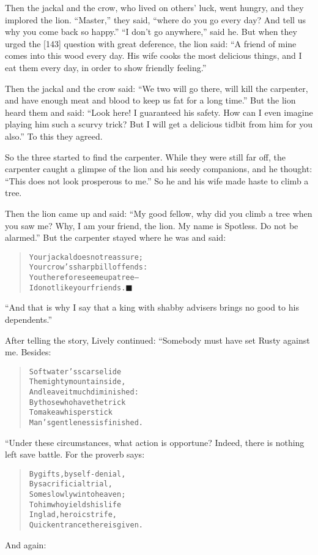 \documentclass[article, twoside, 14pt]{memoir}
\newcommand{\qed}{\hfill \ensuremath{\blacksquare}}
\renewenvironment{verbatim}{%
\begin{quote}%
\vskip -10pt%
\begin{alltt}\normalfont\large}{\end{alltt}%
\end{quote}%
\vskip -10pt
} %
\begin{document}
Then the jackal and the crow, who lived on others' luck, went
hungry, and they implored the lion. ``Master,'' they said,
``where do you go every day? And tell us why you come back so happy.''
``I don't go anywhere,'' said he. But when they urged the [143]
question with great deference, the lion said:
``A friend of mine comes into this wood every day. His wife cooks the most delicious things, and I eat them every day, in order to show friendly feeling.''

Then the jackal and the crow said:
``We two will go there, will kill the carpenter, and have enough meat and blood to keep us fat for a long time.''
But the lion heard them and said:
``Look here! I guaranteed his safety. How can I even imagine playing him such a scurvy trick? But I will get a delicious tidbit from him for you also.''
To this they agreed.

So the three started to find the carpenter. While they were still
far off, the carpenter caught a glimpse of the lion and his seedy
companions, and he thought:
``This does not look prosperous to me.'' So he and his wife made
haste to climb a tree.

Then the lion came up and said:
``My good fellow, why did you climb a tree when you saw me? Why, I am your friend, the lion. My name is Spotless. Do not be alarmed.''
But the carpenter stayed where he was and said:

\begin{verbatim}
Your jackal does not reassure;
    Your crow's sharp bill offends:
You therefore see me up a tree--
    I do not like your friends.\hyperref[s17]{\qed}
\end{verbatim}
``And that is why I say that a king with shabby advisers brings no good to his dependents.''

After telling the story, Lively continued: “Somebody must have set
Rusty against me. Besides:

\begin{verbatim}
Soft water's scars elide
The mighty mountain side,
    And leave it much diminished:
By those who have the trick
To make a whisper stick
    Man's gentleness is finished.
\end{verbatim}
“Under these circumstances, what action is opportune? Indeed, there
is nothing left save battle. For the proverb says:

\begin{verbatim}
By gifts, by self-denial,
By sacrificial trial,
    Some slowly win to heaven;
To him who yields his life
In glad, heroic strife,
    Quick entrance there is given.
\end{verbatim}
And again:
\end{document}

